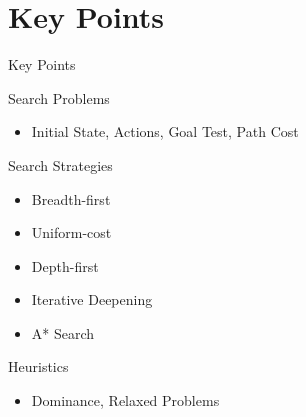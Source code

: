 \documentclass[14pt]{beamer}
\begin{document}
\part{Key Points}
\begin{frame}[label=key-points]{Key Points}
\begin{block}{Search Problems}
\begin{itemize}
\item Initial State, Actions, Goal Test, Path Cost
\end{itemize}
\end{block}
\begin{block}{Search Strategies}
\begin{itemize}
\item Breadth-first
\item Uniform-cost
\item Depth-first
\item Iterative Deepening
\item A* Search
\end{itemize}
\end{block}
\begin{block}{Heuristics}
\begin{itemize}
\item Dominance, Relaxed Problems
\end{itemize}
\end{block}
\end{frame}
\end{document}
